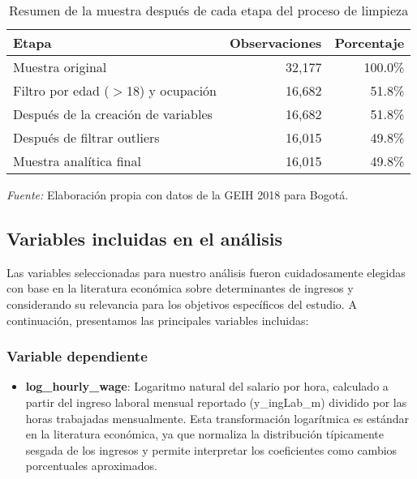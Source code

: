\documentclass[12pt,a4paper,onecolumn]{article}
\begin{document}
\begin{table}[htbp]
    \centering
    \caption{Resumen de la muestra después de cada etapa del proceso de limpieza}
    \label{tab:sample_summary}
    \begin{tabular}{lrr}
    \toprule
    \textbf{Etapa} & \textbf{Observaciones} & \textbf{Porcentaje} \\
    \midrule
    Muestra original & 32,177 & 100.0\% \\
    Filtro por edad ($>$18) y ocupación & 16,682 & 51.8\% \\
    Después de la creación de variables & 16,682 & 51.8\% \\
    Después de filtrar outliers & 16,015 & 49.8\% \\
    Muestra analítica final & 16,015 & 49.8\% \\
    \bottomrule
    \end{tabular}
    \begin{flushleft}
    \footnotesize \textit{Fuente:} Elaboración propia con datos de la GEIH 2018 para Bogotá.
    \end{flushleft}
\end{table}


\subsection{Variables incluidas en el análisis}

Las variables seleccionadas para nuestro análisis fueron cuidadosamente elegidas con base en la literatura económica sobre determinantes de ingresos y considerando su relevancia para los objetivos específicos del estudio. A continuación, presentamos las principales variables incluidas:


\subsubsection{Variable dependiente}

\begin{itemize}
    \item \textbf{log\_hourly\_wage}: Logaritmo natural del salario por hora, calculado a partir del ingreso laboral mensual reportado (y\_ingLab\_m) dividido por las horas trabajadas mensualmente. Esta transformación logarítmica es estándar en la literatura económica, ya que normaliza la distribución típicamente sesgada de los ingresos y permite interpretar los coeficientes como cambios porcentuales aproximados.
\end{itemize}
\end{document}
